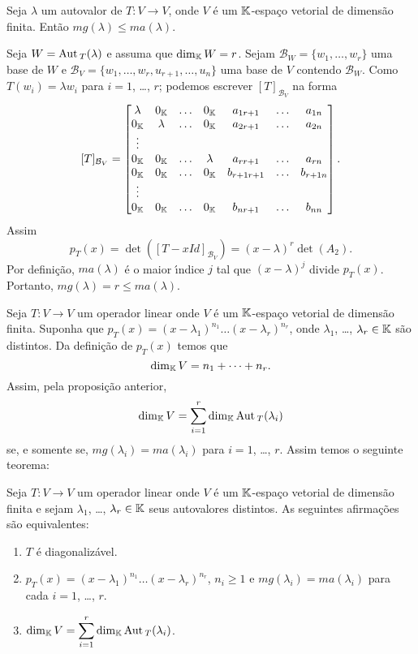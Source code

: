 \begin{proposicao}
	Seja $\lambda$ um autovalor de $T : V \to V$, onde $V$ \'e um $\mathbb{K}$-espa\c{c}o vetorial de dimens\~ao finita. Ent\~ao $mg(\lambda) \le ma(\lambda)$.
\end{proposicao}
\begin{prova}
	Seja $W = {\rm Aut\,}_T(\lambda)$ e assuma que $\dim_{\mathbb{K}}W = r$. Sejam $\mathcal{B}_W = \{w_1,\dots,w_r\}$ uma base de $W$ e $\mathcal{B}_V = \{w_1,\dots,w_r,u_{r + 1},\dots,u_n\}$ uma base de $V$ contendo $\mathcal{B}_W$. Como $T(w_i) = \lambda w_i$ para $i = 1$, \dots, $r$; podemos escrever $[T]_{\mathcal{B}_V}$ na forma
	\[
		[T]_{\mathcal{B}_V} = \begin{bmatrix}
			\lambda & 0_{\mathbb{K}} & \dots & 0_{\mathbb{K}} & a_{1r+1} & \dots & a_{1n}\\
			0_{\mathbb{K}} & \lambda &  \dots & 0_{\mathbb{K}} & a_{2r+1} & \dots & a_{2n}\\
			\vdots\\
			0_{\mathbb{K}} & 0_{\mathbb{K}} & \dots & \lambda & a_{rr+1} & \dots & a_{rn}\\
			0_{\mathbb{K}} & 0_{\mathbb{K}} & \dots & 0_{\mathbb{K}} & b_{r+1r+1} & \dots & b_{r+1n}\\
			\vdots\\
			0_{\mathbb{K}} & 0_{\mathbb{K}} & \dots & 0_{\mathbb{K}} & b_{nr+1} & \dots & b_{nn}\\
		\end{bmatrix}.
	\]
	Assim
	\[
		p_T(x) = \det([T - xId]_{\mathcal{B}_V}) = (x - \lambda)^r\det(A_2).
	\]
	Por defini\c{c}\~ao, $ma(\lambda)$ \'e o maior {\'\i}ndice $j$ tal que $(x - \lambda)^j$ divide $p_T(x)$. Portanto, $mg(\lambda) = r \le ma(\lambda)$.
\end{prova}

Seja $T : V \to V$ um operador linear onde $V$ \'e um $\mathbb{K}$-espa\c{c}o vetorial de dimens\~ao finita. Suponha que $p_T(x) = (x - \lambda_1)^{n_1}\dots(x - \lambda_r)^{n_r}$, onde $\lambda_1$, \dots, $\lambda_r \in \mathbb{K}$ s\~ao distintos. Da defini\c{c}\~ao de $p_T(x)$ temos que
\[
	\dim_{\mathbb{K}}V = n_1 + \cdots + n_r.
\]
Assim, pela proposi\c{c}\~ao anterior,
\[
	\dim_{\mathbb{K}}V = \sum_{i = 1}^r \dim_{\mathbb{K}}{\rm Aut\,}_T(\lambda_i)
\]
se, e somente se, $mg(\lambda_i) = ma(\lambda_i)$ para $i = 1$, \dots, $r$. Assim temos o seguinte teorema:
\begin{teorema}
	Seja $T : V \to V$ um operador linear onde $V$ \'e um $\mathbb{K}$-espa\c{c}o vetorial de dimens\~ao finita e sejam $\lambda_1$, \dots, $\lambda_r \in \mathbb{K}$ seus autovalores distintos. As seguintes afirma\c{c}\~oes s\~ao equivalentes:
	\begin{enumerate}[label=({\roman*})]
		\item $T$ \'e diagonaliz\'avel.
		\item $p_T(x) = (x - \lambda_1)^{n_1}\dots(x - \lambda_r)^{n_r}$, $n_i \ge 1$ e $mg(\lambda_i) = ma(\lambda_i)$ para cada $i = 1$, \dots, $r$.
		\item $\dim_{\mathbb{K}}V = \displaystyle\sum_{i = 1}^r \dim_{\mathbb{K}}{\rm Aut\,}_T(\lambda_i)$.
	\end{enumerate}
\end{teorema}

